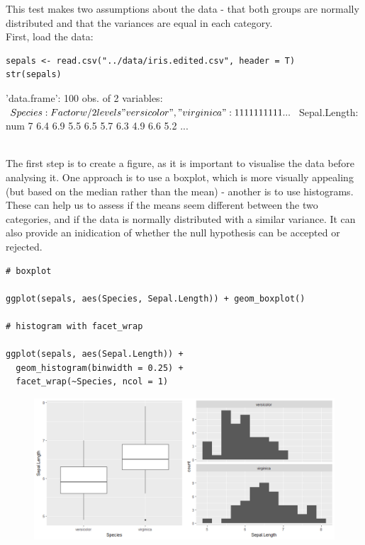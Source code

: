 \documentclass[a4paper,12pt]{article}
\begin{document}
This test makes two assumptions about the data - that both groups are normally distributed and that the variances are equal in each category. \\

First, load the data:

\begin{shaded}
\begin{verbatim}
sepals <- read.csv("../data/iris.edited.csv", header = T)
str(sepals)
\end{verbatim}


\begin{Schunk}
\begin{Soutput}
'data.frame':	100 obs. of  2 variables:
 $ Species     : Factor w/ 2 levels "versicolor","virginica": 1 1 1 1 1 1 1 1 1 1 ...
 $ Sepal.Length: num  7 6.4 6.9 5.5 6.5 5.7 6.3 4.9 6.6 5.2 ...
\end{Soutput}
\end{Schunk}
\end{shaded}
{ }\\

The first step is to create a figure, as it is important to visualise the data before analysing it. One approach is to use a boxplot, which is more visually appealing (but based on the median rather than the mean) - another is to use histograms. These can help us to assess if the means seem different between the two categories, and if the data is normally distributed with a similar variance. It can also provide an inidication of whether the null hypothesis can be accepted or rejected. \\

\begin{shaded}
\begin{verbatim}
# boxplot

ggplot(sepals, aes(Species, Sepal.Length)) + geom_boxplot()

# histogram with facet_wrap

ggplot(sepals, aes(Sepal.Length)) + 
  geom_histogram(binwidth = 0.25) + 
  facet_wrap(~Species, ncol = 1)
\end{verbatim}
\end{shaded}

\begin{figure}[h]
	\centering 
	\includegraphics[width=1\textwidth]{figs/boxplothist.png}
	\label{fig:boxplothist}
\end{figure} 
\end{document}
